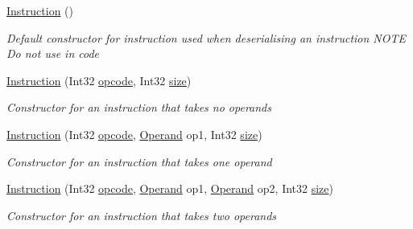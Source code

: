 \begin{DoxyCompactItemize}
\item 
\hyperlink{class_c_p_u___o_s___simulator_1_1_c_p_u_1_1_instruction_a2038c543e7b47a5997405f56cb8c7aa9}{Instruction} ()
\begin{DoxyCompactList}\small\item\em Default constructor for instruction used when deserialising an instruction N\+O\+T\+E Do not use in code \end{DoxyCompactList}\item 
\hyperlink{class_c_p_u___o_s___simulator_1_1_c_p_u_1_1_instruction_afb0f711deb1e6e4dc53fa2ffa4458a66}{Instruction} (Int32 \hyperlink{class_c_p_u___o_s___simulator_1_1_c_p_u_1_1_instruction_a746bbd915670c4c18c495804ee484e57}{opcode}, Int32 \hyperlink{class_c_p_u___o_s___simulator_1_1_c_p_u_1_1_instruction_ac8c820f3e522e4fefaa510856ed11fb0}{size})
\begin{DoxyCompactList}\small\item\em Constructor for an instruction that takes no operands \end{DoxyCompactList}\item 
\hyperlink{class_c_p_u___o_s___simulator_1_1_c_p_u_1_1_instruction_a43b7a2a32e40bb61c9a17bf2f6d42baa}{Instruction} (Int32 \hyperlink{class_c_p_u___o_s___simulator_1_1_c_p_u_1_1_instruction_a746bbd915670c4c18c495804ee484e57}{opcode}, \hyperlink{class_c_p_u___o_s___simulator_1_1_c_p_u_1_1_operand}{Operand} op1, Int32 \hyperlink{class_c_p_u___o_s___simulator_1_1_c_p_u_1_1_instruction_ac8c820f3e522e4fefaa510856ed11fb0}{size})
\begin{DoxyCompactList}\small\item\em Constructor for an instruction that takes one operand \end{DoxyCompactList}\item 
\hyperlink{class_c_p_u___o_s___simulator_1_1_c_p_u_1_1_instruction_a8d2f29ef83f5166c5653357fc25d9ad5}{Instruction} (Int32 \hyperlink{class_c_p_u___o_s___simulator_1_1_c_p_u_1_1_instruction_a746bbd915670c4c18c495804ee484e57}{opcode}, \hyperlink{class_c_p_u___o_s___simulator_1_1_c_p_u_1_1_operand}{Operand} op1, \hyperlink{class_c_p_u___o_s___simulator_1_1_c_p_u_1_1_operand}{Operand} op2, Int32 \hyperlink{class_c_p_u___o_s___simulator_1_1_c_p_u_1_1_instruction_ac8c820f3e522e4fefaa510856ed11fb0}{size})
\begin{DoxyCompactList}\small\item\em Constructor for an instruction that takes two operands \end{DoxyCompactList}\item 

\end{DoxyCompactItemize}
